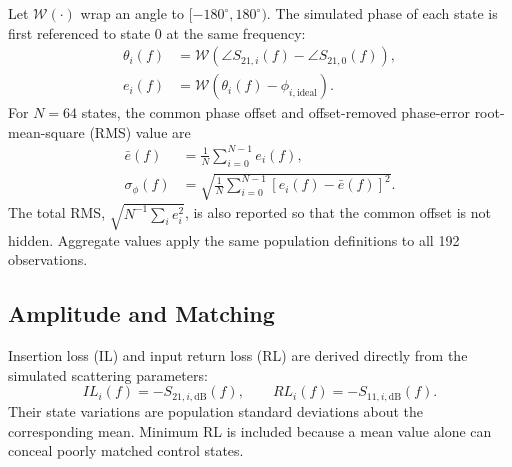 \documentclass[conference]{IEEEtran}
\begin{document}
Let $\mathcal{W}(\cdot)$ wrap an angle to
$[-180^\circ,180^\circ)$. The simulated phase of each state is first
referenced to state 0 at the same frequency:
\begin{equation}
\begin{aligned}
 \theta_i(f)
  &=\mathcal{W}\!\left(\angle S_{21,i}(f)-\angle S_{21,0}(f)\right),\\
 e_i(f)
  &=\mathcal{W}\!\left(\theta_i(f)-\phi_{i,\mathrm{ideal}}\right).
\end{aligned}
\label{eq:phase_error}
\end{equation}
For $N=64$ states, the common phase offset and offset-removed phase-error
root-mean-square (RMS) value are
\begin{equation}
\begin{aligned}
 \bar e(f) &= \frac{1}{N}\sum_{i=0}^{N-1}e_i(f),\\
 \sigma_\phi(f) &=
 \sqrt{\frac{1}{N}\sum_{i=0}^{N-1}\left[e_i(f)-\bar e(f)\right]^2}.
\end{aligned}
\label{eq:phase_rms}
\end{equation}
The total RMS,
$\sqrt{N^{-1}\sum_i e_i^2}$, is also reported so that the common offset is
not hidden. Aggregate values apply the same population definitions to all
192 observations.

\subsection{Amplitude and Matching}

Insertion loss (IL) and input return loss (RL) are derived directly from the
simulated scattering parameters:
\begin{equation}
  IL_i(f)=-S_{21,i,\mathrm{dB}}(f),\qquad
  RL_i(f)=-S_{11,i,\mathrm{dB}}(f).
\label{eq:loss_metrics}
\end{equation}
Their state variations are population standard deviations about the
corresponding mean. Minimum RL is included because a mean value alone can
conceal poorly matched control states.
\end{document}
